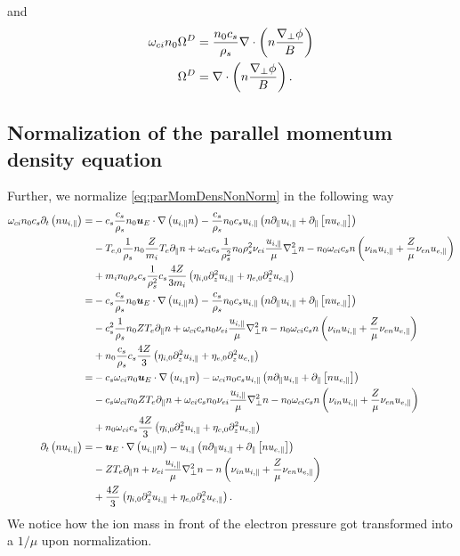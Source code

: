 %
and
%
\begin{align*}
    \omega_{ci}n_0\Omega^D &= \frac{n_0 c_s}{\rho_s}\nabla\cdot\left(n\frac{\nabla_\perp\phi}{B}\right)\\
    \Omega^D &= \nabla\cdot\left(n\frac{\nabla_\perp\phi}{B}\right).
\end{align*}
%

\subsection{Normalization of the parallel momentum density equation}
%
Further, we normalize \cref{eq:parMomDensNonNorm} in the following way
%
\begin{align*}
    \omega_{ci}n_0c_s \partial_t\left( n u_{i,\|}\right)
 =&
 - c_s\frac{c_s}{\rho_s}n_0
  \boldsymbol{u}_E \cdot \nabla\left( u_{i,\|} n \right)
 - \frac{c_s}{\rho_s}n_0c_s
    u_{i, \|}
    \left(
    n \partial_\| u_{i,\|}
    + \partial_\|\left[n u_{e,\|} \right]
    \right)   \\&
    - T_{e,0}\frac{1}{\rho_s}n_0
 \frac{Z}{m_i} T_e \partial_\| n
 + \omega_{ci}c_s\frac{1}{\rho_s^2}n_0\rho_s^2
 \nu_{ei} \frac{u_{i,\|}}{\mu} \nabla_\perp^2 n
 - n_0\omega_{ci}c_s
 n \left(\nu_{i n}u_{i,\|} + \frac{Z}{\mu} \nu_{e n}u_{e,\|}\right)
   \\&
   + m_in_0\rho_sc_s\frac{1}{\rho_s^2}c_s \frac{4Z}{3m_i}\left(
   \eta_{i,0} \partial_z^2 u_{i,\|}
 + \eta_{e,0}\partial_z^2 u_{e,\|}
 \right)
 \\
 =&
 - c_s\frac{c_s}{\rho_s}n_0
  \boldsymbol{u}_E \cdot \nabla\left( u_{i,\|} n \right)
 - \frac{c_s}{\rho_s}n_0c_s
  u_{i, \|}
    \left(
    n \partial_\| u_{i,\|}
    + \partial_\|\left[n u_{e,\|} \right]
    \right)
   \\&
 - c_s^2\frac{1}{\rho_s}n_0
 ZT_e \partial_\| n
 + \omega_{ci}c_sn_0
 \nu_{ei} \frac{u_{i,\|}}{\mu} \nabla_\perp^2 n
 - n_0\omega_{ci}c_s
 n \left(\nu_{i n}u_{i,\|} + \frac{Z}{\mu} \nu_{e n}u_{e,\|}\right)
   \\&
   + n_0\frac{c_s}{\rho_s}c_s\frac{4Z}{3}\left(
   \eta_{i,0} \partial_z^2 u_{i,\|}
 + \eta_{e,0}\partial_z^2 u_{e,\|}
 \right)
 \\
 =&
 - c_s\omega_{ci}n_0
  \boldsymbol{u}_E \cdot \nabla\left( u_{i,\|} n \right)
 - \omega_{ci}n_0c_s
  u_{i, \|}
    \left(
    n \partial_\| u_{i,\|}
    + \partial_\|\left[n u_{e,\|} \right]
    \right)
    \\&
 - c_s\omega_{ci}n_0Z
 T_e \partial_\| n
 + \omega_{ci}c_sn_0
 \nu_{ei} \frac{u_{i,\|}}{\mu} \nabla_\perp^2 n
 - n_0\omega_{ci}c_s
 n \left(\nu_{i n}u_{i,\|} + \frac{Z}{\mu} \nu_{e n}u_{e,\|}\right)
   \\&
   + n_0\omega_{ci}c_s\frac{4Z}{3}\left(\eta_{i,0} \partial_z^2 u_{i,\|}
 + \eta_{e,0}\partial_z^2 u_{e,\|}\right)
 \\
  \partial_t\left( n u_{i,\|}\right)
 =&
 -  \boldsymbol{u}_E \cdot \nabla\left( u_{i,\|} n \right)
 - u_{i, \|}
    \left(
    n \partial_\| u_{i,\|}
    + \partial_\|\left[n u_{e,\|} \right]
    \right)
   \\&
 - ZT_e \partial_\| n
 + \nu_{ei} \frac{u_{i,\|}}{\mu} \nabla_\perp^2 n
 - n \left(\nu_{i n}u_{i,\|} + \frac{Z}{\mu} \nu_{e n}u_{e,\|}\right)
   \\&
   + \frac{4Z}{3}\left(\eta_{i,0} \partial_z^2 u_{i,\|}
 + \eta_{e,0}\partial_z^2 u_{e,\|}\right).
\end{align*}
%
We notice how the ion mass in front of the electron pressure got transformed into a $1/\mu$ upon normalization.

